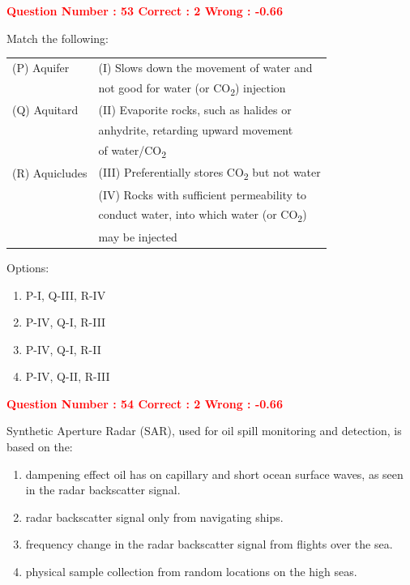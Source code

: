 \documentclass[12pt]{article}
\begin{document}
{\textcolor{red}{\textbf{Question Number : 53 \hfill Correct : 2  Wrong : -0.66}}

\vspace{0.5em}

Match the following:

\vspace{0.5em}

\begin{tabular}{ll}
(P) Aquifer     & (I) Slows down the movement of water and \\
                & \hfill not good for water (or CO\textsubscript{2}) injection \\
(Q) Aquitard    & (II) Evaporite rocks, such as halides or \\
                & \hfill anhydrite, retarding upward movement \\
                & \hfill of water/CO\textsubscript{2} \\
(R) Aquicludes  & (III) Preferentially stores CO\textsubscript{2} but not water \\
                & (IV) Rocks with sufficient permeability to \\
                & \hfill conduct water, into which water (or CO\textsubscript{2}) \\
                & \hfill may be injected \\
\end{tabular}

\vspace{1em}

Options:
\begin{enumerate}[label=(\Alph*)]
    \item P-I, Q-III, R-IV  
    \item P-IV, Q-I, R-III  
    \item P-IV, Q-I, R-II  
    \item P-IV, Q-II, R-III  
\end{enumerate}

\textcolor{red}{\textbf{Question Number : 54 \hfill Correct : 2  Wrong : -0.66}}

\vspace{0.5em}

Synthetic Aperture Radar (SAR), used for oil spill monitoring and detection, is based on the:

\begin{enumerate}[label=(\Alph*)]
    \item dampening effect oil has on capillary and short ocean surface waves, as seen in the radar backscatter signal.
    \item radar backscatter signal only from navigating ships.
    \item frequency change in the radar backscatter signal from flights over the sea.
    \item physical sample collection from random locations on the high seas.
\end{enumerate}

}
\end{document}
